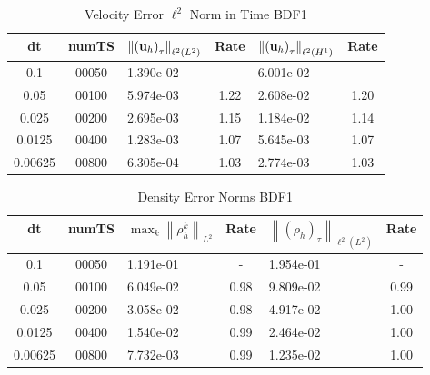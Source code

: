\documentclass[letterpaper]{erdc}
\begin{document}
\begin{table}[h!]
  \begin{center}
    \caption{Velocity Error $\ell^2$ Norm in Time BDF1}
    \begin{tabular}{c|c|l|c|l|c}
      dt & numTS &  $\left\|\left(\textbf{u}_h\right)_{\tau}\right\|_{\ell^2(L^2)}$  &  Rate  &  $\left\|\left(\textbf{u}_h\right)_{\tau}\right\|_{\ell^2(H^1)}$  &  Rate\\
      \hline
      0.1     & 00050 & 1.390e-02 &   -  & 6.001e-02 &  -  \\
      0.05    & 00100 & 5.974e-03 & 1.22 & 2.608e-02 & 1.20\\
      0.025   & 00200 & 2.695e-03 & 1.15 & 1.184e-02 & 1.14\\
      0.0125  & 00400 & 1.283e-03 & 1.07 & 5.645e-03 & 1.07\\
      0.00625 & 00800 & 6.305e-04 & 1.03 & 2.774e-03 & 1.03
    \end{tabular}
  \end{center}
\end{table}


\begin{table}[h!]
  \begin{center}
    \caption{Density Error Norms BDF1}
    \begin{tabular}{c|c|l|c|l|c}
      dt & numTS  & $\displaystyle\max_{k} \left\|\rho^{k}_{h}\right\|_{L^2}$ &  Rate  &  $\left\|\left(\rho_h\right)_{\tau}\right\|_{\ell^2(L^2)}$  &  Rate\\
      \hline
      0.1     & 00050 & 1.191e-01 &   -  & 1.954e-01 &   - \\
      0.05    & 00100 & 6.049e-02 & 0.98 & 9.809e-02 & 0.99\\
      0.025   & 00200 & 3.058e-02 & 0.98 & 4.917e-02 & 1.00\\
      0.0125  & 00400 & 1.540e-02 & 0.99 & 2.464e-02 & 1.00\\
      0.00625 & 00800 & 7.732e-03 & 0.99 & 1.235e-02 & 1.00
    \end{tabular}
  \end{center}
\end{table}
\end{document}
